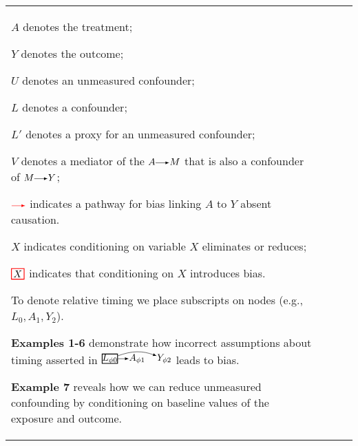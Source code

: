 {\begin{tabular}{>{\raggedright\arraybackslash\small}m{0.5cm} >{\raggedright\arraybackslash\small}m{5.5cm} >{\raggedright\arraybackslash\small}m{4cm} >{\raggedright\arraybackslash\small}m{3.5cm}}
{$A$ denotes the treatment;

$Y$ denotes the outcome;

$U$ denotes an unmeasured confounder;

$L$ denotes a confounder;

$L'$ denotes a proxy for an unmeasured confounder;


$V$ denotes a mediator of the $A\rightarrowNEW M$ that is also a confounder of $M\rightarrowNEW Y$;

$\rightarrowred$ indicates a pathway for bias linking $A$ to $Y$ absent causation.

$\boxed{X}$ indicates conditioning on variable $X$ eliminates or reduces;

$\boxedred{X}$ indicates that conditioning on $X$ introduces bias.

To denote relative timing we place subscripts on nodes (e.g., $L_0, A_1, Y_2$).

\textbf{Examples 1-6} demonstrate how incorrect assumptions about timing asserted in $\atoyassumedtiny$ leads to bias.

\textbf{Example 7} reveals how we can reduce unmeasured confounding by conditioning on baseline values of the exposure and outcome.}
\end{tabular}
}
